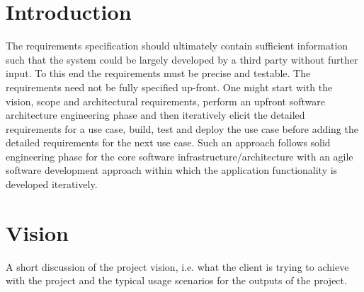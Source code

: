 \documentclass[a4paper,12pt]{article}
\begin{document}
\newpage



\section{Introduction}

The requirements specification should ultimately contain sufficient information such that the
system could be largely developed by a third party without further input. To this end the
requirements must be precise and testable.
The requirements need not be fully specified up-front. One might start with the vision, scope
and architectural requirements, perform an upfront software architecture engineering phase and
then iteratively elicit the detailed requirements for a use case, build, test and deploy the use
case before adding the detailed requirements for the next use case. Such an approach follows
solid engineering phase for the core software infrastructure/architecture with an agile software
development approach within which the application functionality is developed iteratively.

\section{Vision}

A short discussion of the project vision, i.e. what the client is trying to achieve with the project
and the typical usage scenarios for the outputs of the project.

\end{document}
